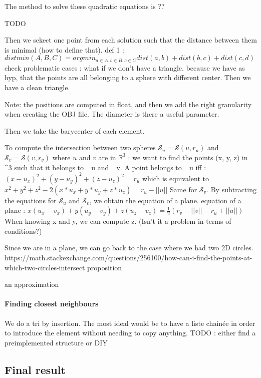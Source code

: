 \documentclass{article}
\begin{document}
The method to solve these quadratic equations is ?? 

TODO

Then we sekect one point from each solution such that the distance between them is minimal (how to define that). 
def 1 : $distmin(A, B, C) = argmin_{a \in A, b \in B, c \in C}  dist(a, b) + dist(b, c) + dist(c, d)$
check problematic cases : what if we don't have a triangle.
because we have as hyp, that the points are all belonging to a sphere with different center. Then we have a clean triangle. 


Note: the positions are computed in float, and then we add the right granularity when creating the OBJ file. The diameter is there a useful parameter. 

Then we take the barycenter of each element. 

To compute the intersection between two spheres $\mathcal{S}_{u} = \mathcal{S}(u, r_{u})$ and $\mathcal{S}_{v} = \mathcal{S}(v, r_{v})$ where $u$ and $v$ are in $\mathbb{R}^3$ :
we want to find the points (x, y, z) in ^{3} such that it belongs to _{u} and _{v}. 
A point belongs to _{u} iff : 
$ (x-u_{x})^2 + (y - u_{y})^2 + (z - u_{z})^2 = r_{u}$
which is equivalent to \\
$x^2+ y^2+z^2 - 2 (x * u_{x} + y * u_{y} + z * u_{z}) = r_{u} - ||u||$
Same for $\mathcal{S}_v$.  
By subtracting the equations for $\mathcal{S}_u$ and $\mathcal{S}_v$, we obtain the equation of a plane. 
equation of a plane : 
$x(u_{x} - v_{x}) + y (u_{y} - v_{y}) + z (u_{z} - v_{z}) = \frac{1}{2} (r_{v} - ||v|| - r_{u} + ||u||)$
When knowing x and y, we can compute z. (Isn't it a problem in terms of conditions?)

Since we are in a plane, we can go back to the case where we had two 2D circles.  
https://math.stackexchange.com/questions/256100/how-can-i-find-the-points-at-which-two-circles-intersect proposition

an approximation

\paragraph{Finding closest neighbours}
We do a tri by insertion. 
The most ideal would be to have a liste chainée in order to introduce the element without needing to copy anything. 
TODO : either find a preimplemented structure or DIY






\subsection{Final result}


\printbibliography[
heading=bibintoc,
title={Bibliography}
]
\end{document}
